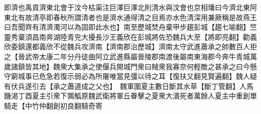 即濟也禹貢濟東北會于汶今枯渠注巨澤巨澤北則清水與汶會也京相璠曰今濟北東阿東北有故清亭即春秋所謂清者也是濟水通得清之目焉亦水色清深用兼厥稱是故燕王曰吾聞齊有清濟濁河以為固即此水也】南至歷城焚舟棄甲步趨彭城【趨七喻翻】竺靈秀棄須昌南奔湖陸青兖大擾長沙王義欣在彭城將佐恐魏兵大至【將即亮翻】勸義欣委鎮還都義欣不從魏兵攻濟南【濟南郡治歷城】濟南太守武進蕭承之帥數百人拒之【晉武帝太康二年分丹徒曲阿立武進縣屬晉陵郡南渡後屬南東海郡今奔牛青城萬歲諸鎮皆其地】魏衆大集承之使偃兵開城門衆曰賊衆我寡奈何輕敵之甚承之曰今懸守窮城事已危急若復示弱必為所屠唯當見彊以待之耳【復扶又翻見賢遍翻】魏人疑有伏兵遂引去【承之蕭道成之父也】　魏軍圍夏主數日斷其水草【斷丁管翻】人馬饑渇丁酉夏主引衆下鶉觚原魏武衛將軍丘眷擊之夏衆大潰死者萬餘人夏主中重創單騎走【中竹仲翻創初良翻騎奇寄